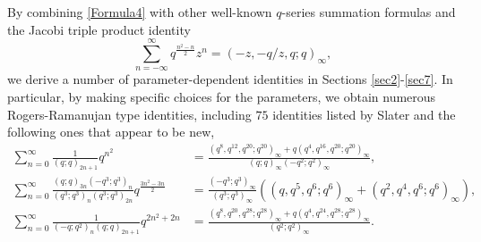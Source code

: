 \documentclass[reqno,12pt]{amsart}
\theoremstyle{remark}
\numberwithin{equation}{section}
\begin{document}
By combining  \eqref{Formula4} with other well-known $q$-series summation formulas and  the Jacobi triple product identity  \cite[Eq. (1.6.1)]{Gasper_and_Rahman}
\begin{equation}\label{Jacobi}
\sum_{n=-\infty}^{\infty}q^{\frac{n^2-n}{2}}z^n
=\left(-z,-q/z,q;q\right)_{\infty},
\end{equation}
we derive a number of  parameter-dependent identities in Sections \ref{sec2}-\ref{sec7}.  In particular, by making specific choices for the parameters, we obtain numerous  Rogers-Ramanujan type identities, including $75$ identities listed by Slater and  the following ones that appear to be new,
\begin{align*}
\sum_{n=0}^{\infty}\frac{1}{\left(q;q\right)_{2n+1}}q^{n^2}&=
\frac{\left(q^8,q^{12},q^{20};q^{20}\right)_{\infty}+q\left(q^4,q^{16},q^{20};q^{20}\right)_{\infty}}
{\left(q;q\right)_{\infty}\left(-q^2;q^2\right)_{\infty}},
\\
\sum_{n=0}^{\infty}\frac{\left(q;q\right)_{3n}\left(-q^3;q^3\right)_n}
{\left(q^3;q^3\right)_n\left(q^3;q^3\right)_{2n}}q^{\frac{3n^2-3n}{2}}
&\!=\!\frac{\left(-q^3;q^3\right)_{\infty}}{\left(q^3;q^3\right)_{\infty}}
\left(\left(q,q^5,q^6;q^6\right)_{\infty}+\left(q^2,q^4,q^6;q^6\right)_{\infty}\right),\\
\sum_{n=0}^{\infty}\frac{1}{\left(-q;q^2\right)_{n}\left(q;q\right)_{2n+1}}q^{2n^2+2n}
&\!=\!\frac{\left(q^8,q^{20},q^{28};q^{28}\right)_{\infty}+
q
\left(q^4,q^{24},q^{28};q^{28}\right)_{\infty}
}{\left(q^2;q^2\right)_{\infty}}.
\end{align*}
\end{document}
